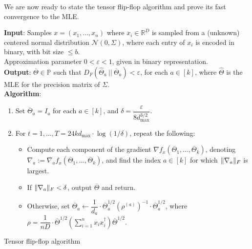 \documentclass[aos]{imsart}
\theoremstyle{definition}
\numberwithin{equation}{section}
\DeclarePairedDelimiter{\norm}{\lVert}{\rVert}
\newcommand{\R}{{\mathbb{R}}}
\newcommand{\otheta}{\overline{\Theta}}
\newcommand{\htheta}{\widehat{\Theta}}
\newcommand{\eps}{\varepsilon}
\newcommand{\cN}{\mathcal{N}}
\newcommand{\SPD}{\mathbb{P}}
\newcommand{\samp}{x}
\def\dmax{d_{\max}}
\begin{document}
We are now ready to state the tensor flip-flop algorithm and prove its fast convergence to the MLE.

\begin{Algorithm}
\textbf{Input}: Samples $\samp = (\samp_1, \ldots, \samp_n)$ where $\samp_i \in \R^D$ is sampled from a (unknown) centered normal distribution $\cN(0, \Sigma)$, where each entry of $\samp_i$ is encoded in binary, with bit size $\le b$. \\ Approximation parameter $0 < \eps < 1$, given in binary representation. \\[.3ex]

\textbf{Output}: $\otheta \in \SPD$ such that $D_F(\htheta_a \ || \ \otheta_a) < \eps$, for each $a \in [k]$, where $\htheta$ is the MLE for the precision matrix of $\Sigma$. \\[.3ex]

\textbf{Algorithm}:
\begin{enumerate}
\item\label{it:flip-flop step 1} Set $\otheta_a = I_a$ for each $a \in [k]$, and 
$\delta = \dfrac{\eps}{8 \dmax^{3/2}}$. 

\vspace{5pt}

\item\label{it:flip-flop step 2} For $t=1,\dots,T = 24 k \dmax \cdot \log(1/\delta)$, repeat the following:

\vspace{5pt}

\begin{itemize}
\item Compute each component of the gradient $\nabla f_{\samp}(\otheta_1, \ldots, \otheta_k)$, denoting $\nabla_a := \nabla_a f_{\samp}(\otheta_1, \ldots, \otheta_k)$, and find the index $a \in [k]$ for which $\norm{\nabla_a}_F$ is largest.

\vspace{5pt}

\item
If $\norm{\nabla_a}_F < \delta$, output $\otheta$ and return.

\vspace{5pt}

\item Otherwise, set $\otheta_a \leftarrow  \dfrac{1}{d_a} \cdot \otheta_a^{1/2} (\rho^{(a)})^{-1} \cdot \otheta_a^{1/2}$, where $\rho = \dfrac{1}{nD} \cdot \otheta^{1/2} \left( \sum_{i=1}^n x_ix_i^\dagger \right) \otheta^{1/2}.$
\end{itemize}
\end{enumerate}
\caption{Tensor flip-flop algorithm}\label{alg:tensor-flip-flop}
\end{Algorithm}
\end{document}
